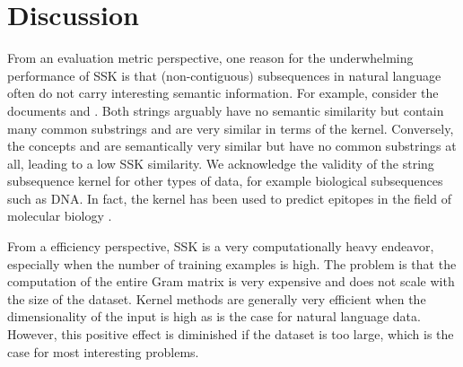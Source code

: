 \section{Discussion} \label{sec:discussion}

From an evaluation metric perspective, one reason for the underwhelming performance of SSK is that (non-contiguous) subsequences in natural language often do not carry interesting semantic information. For example, consider the documents  and . Both strings arguably have no semantic similarity but contain many common substrings and are very similar in terms of the kernel. Conversely, the concepts  and  are semantically very similar but have no common substrings at all, leading to a low SSK similarity. We acknowledge the validity of the string subsequence kernel for other types of data, for example biological subsequences such as DNA. In fact, the kernel has been used to predict epitopes in the field of molecular biology \cite{biology}.

From a efficiency perspective, SSK is a very computationally heavy endeavor, especially when the number of training examples is high. The problem is that the computation of the entire Gram matrix is very expensive and does not scale with the size of the dataset. Kernel methods are generally very efficient when the dimensionality of the input is high as is the case for natural language data. However, this positive effect is diminished if the dataset is too large, which is the case for most interesting problems.
